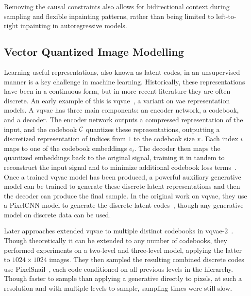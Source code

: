 
Removing the causal constraints also allows for bidirectional context during
sampling and flexible inpainting patterns, rather than being limited to
left-to-right inpainting in autoregressive models.

\subsection{Vector Quantized Image Modelling}
\label{subsec:vqmodelling}
Learning useful representations, also known as latent codes, in an unsupervised
manner is a key challenge in machine learning. Historically, these
representations have been in a continuous form, but in more recent literature
they are often discrete. An early example of this is
\gls{vqvae}~\cite{oord2017vqvae}, a variant on \gls{vae} representation models.
A \gls{vqvae} has three main components: an encoder network, a codebook, and a
decoder. The encoder network outputs a compressed representation of the input,
and the codebook $\mathcal{C}$ quantizes these representations, outputting a
discretized representation of indices from $1$ to the codebook size
$v$. Each index $i$ maps to one of the codebook embeddings $e_i$.
The decoder then maps the quantized embeddings back to the original signal,
training it in tandem to reconstruct the input signal and to minimize additional
codebook loss terms~\cite{oord2017vqvae}. Once a trained \gls{vqvae} model has
been produced, a powerful auxiliary generative model can be trained to generate
these discrete latent representations and then the decoder can produce the final
sample. In the original work on \gls{vqvae}, they use a PixelCNN model to
generate the discrete latent codes~\cite{oord2017vqvae}, though any generative
model on discrete data can be used.

Later approaches extended \gls{vqvae} to multiple distinct codebooks in
\acrshort{vqvae}-2~\cite{razavi2019generating}. Though theoretically it can be
extended to any number of codebooks, they performed experiments on a two-level
and three-level model, applying the latter to $1024 \times 1024$ images. They
then sampled the resulting combined discrete codes use
PixelSnail~\cite{chen2017snail}, each code conditioned on all previous levels in
the hierarchy. Though faster to sample than applying a generative directly to
pixels, at such a resolution and with multiple levels to sample, sampling times
were still slow.

